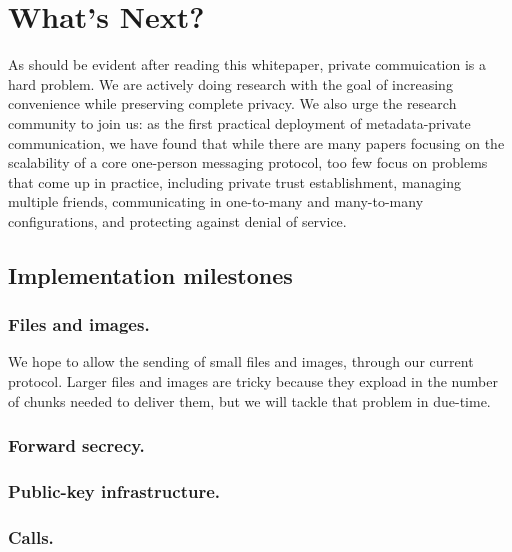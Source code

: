 \section{What's Next?}

As should be evident after reading this whitepaper, private commuication is a hard problem. We are actively doing research with the goal of increasing convenience while preserving complete privacy. We also urge the research community to join us: as the first practical deployment of metadata-private communication, we have found that while there are many papers focusing on the scalability of a core one-person messaging protocol, too few focus on problems that come up in practice, including private trust establishment, managing multiple friends, communicating in one-to-many and many-to-many configurations, and protecting against denial of service.


\subsection{Implementation milestones}


\subsubsection{Files and images.} We hope to allow the sending of small files and images, through our current protocol. Larger files and images are tricky because they expload in the number of chunks needed to deliver them, but we will tackle that problem in due-time.

\subsubsection{Forward secrecy.}

\subsubsection{Public-key infrastructure.}

\subsubsection{Calls.}

